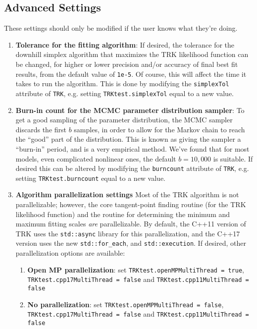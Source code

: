 \documentclass[12pt]{article}
\newcommand{\li}{\lstinline}
\begin{document}
\subsection{Advanced Settings}
These settings should only be modified if the user knows what they're doing.
\begin{enumerate}
    \item \textbf{Tolerance for the fitting algorithm}: If desired, the tolerance for the downhill simplex algorithm that maximizes the TRK likelihood function can be changed, for higher or lower precision and/or accuracy of final best fit results, from the default value of \li{1e-5}. Of course, this will affect the time it takes to run the algorithm. This is done by modifying the \li{simplexTol} attribute of \li{TRK}, e.g. setting \li{TRKtest.simplexTol} equal to a new value.
    \item \textbf{Burn-in count for the MCMC parameter distribution sampler}: To get a good sampling of the parameter distribution, the MCMC sampler discards the first $b$ samples, in order to allow for the Markov chain to reach the ``good'' part of the distribution. This is known as giving the sampler a ``burn-in'' period, and is a very empirical method. We've found that for most models, even complicated nonlinear ones, the default $b=10,000$ is suitable. If desired this can be altered by modifying the \li{burncount} attribute of \li{TRK}, e.g. setting \li{TRKtest.burncount} equal to a new value. 
    \item \textbf{Algorithm parallelization settings} Most of the TRK algorithm is not parallelizable; however, the core tangent-point finding routine (for the TRK likelihood function) and the routine for determining the minimum and maximum fitting scales \textit{are} parallelizable. By default, the C++11 version of TRK uses the \li{std::async} library for this parallelization, and the C++17 version uses the new \li{std::for_each}, and \li{std::execution}. If desired, other parallelization options are available: 
    \begin{enumerate}
        \item \textbf{Open MP parallelization}: set \li{TRKtest.openMPMultiThread = true}, \li{TRKtest.cpp17MultiThread = false} and \li{TRKtest.cpp11MultiThread = false}
        \item \textbf{No parallelization}: set \li{TRKtest.openMPMultiThread = false}, 
        \\\li{TRKtest.cpp17MultiThread = false} and \li{TRKtest.cpp11MultiThread = false}
    \end{enumerate}
\end{enumerate}
\end{document}
